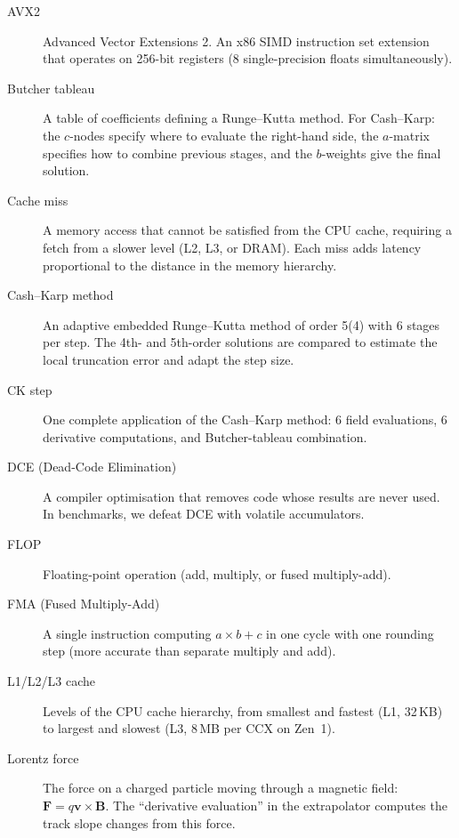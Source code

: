 \documentclass[11pt,a4paper]{article}
\begin{document}
\begin{description}
    \item[AVX2] Advanced Vector Extensions 2.  An x86 SIMD instruction
        set extension that operates on 256-bit registers (8
        single-precision floats simultaneously).

    \item[Butcher tableau] A table of coefficients defining a
        Runge--Kutta method.  For Cash--Karp: the $c$-nodes specify
        where to evaluate the right-hand side, the $a$-matrix specifies
        how to combine previous stages, and the $b$-weights give the
        final solution.

    \item[Cache miss] A memory access that cannot be satisfied from the
        CPU cache, requiring a fetch from a slower level (L2, L3, or
        DRAM).  Each miss adds latency proportional to the distance in
        the memory hierarchy.

    \item[Cash--Karp method] An adaptive embedded Runge--Kutta method
        of order 5(4) with 6 stages per step.  The 4th- and 5th-order
        solutions are compared to estimate the local truncation error
        and adapt the step size.

    \item[CK step] One complete application of the Cash--Karp method:
        6 field evaluations, 6 derivative computations, and
        Butcher-tableau combination.

    \item[DCE (Dead-Code Elimination)] A compiler optimisation that
        removes code whose results are never used.  In benchmarks,
        we defeat DCE with volatile accumulators.

    \item[FLOP] Floating-point operation (add, multiply, or
        fused multiply-add).

    \item[FMA (Fused Multiply-Add)] A single instruction computing
        $a \times b + c$ in one cycle with one rounding step (more
        accurate than separate multiply and add).

    \item[L1/L2/L3 cache] Levels of the CPU cache hierarchy, from
        smallest and fastest (L1, 32\,KB) to largest and slowest
        (L3, 8\,MB per CCX on Zen~1).

    \item[Lorentz force] The force on a charged particle moving through
        a magnetic field: $\mathbf{F} = q\mathbf{v} \times \mathbf{B}$.
        The ``derivative evaluation'' in the extrapolator computes the
        track slope changes from this force.


\end{description}
\end{document}
